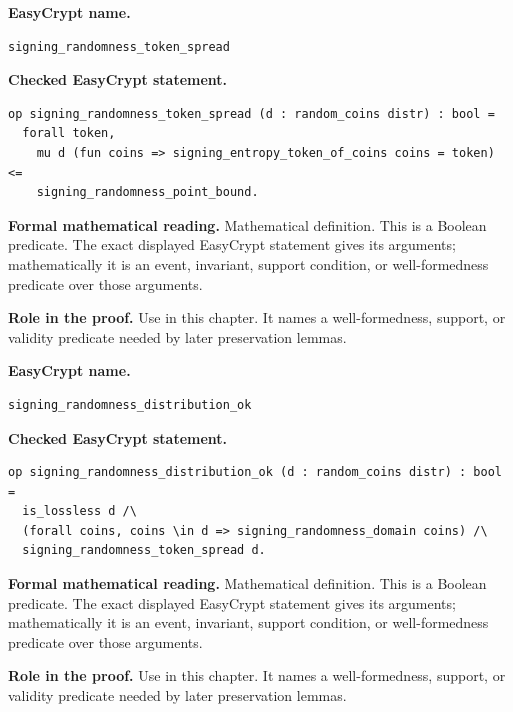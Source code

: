 \begin{formaldefinition}
\noindent\textbf{EasyCrypt name.}
\begin{lstlisting}[language=EasyCrypt,basicstyle=\ttfamily\scriptsize]
signing_randomness_token_spread
\end{lstlisting}
\noindent\textbf{Checked EasyCrypt statement.}
\begin{lstlisting}[language=EasyCrypt,basicstyle=\ttfamily\scriptsize]
op signing_randomness_token_spread (d : random_coins distr) : bool =
  forall token,
    mu d (fun coins => signing_entropy_token_of_coins coins = token) <=
    signing_randomness_point_bound.
\end{lstlisting}
\noindent\textbf{Formal mathematical reading.}
Mathematical definition. This is a Boolean predicate.  The exact displayed EasyCrypt statement gives its arguments; mathematically it is an event, invariant, support condition, or well-formedness predicate over those arguments.

\noindent\textbf{Role in the proof.}
Use in this chapter. It names a well-formedness, support, or validity predicate needed by later preservation lemmas.

\end{formaldefinition}

\begin{formaldefinition}
\noindent\textbf{EasyCrypt name.}
\begin{lstlisting}[language=EasyCrypt,basicstyle=\ttfamily\scriptsize]
signing_randomness_distribution_ok
\end{lstlisting}
\noindent\textbf{Checked EasyCrypt statement.}
\begin{lstlisting}[language=EasyCrypt,basicstyle=\ttfamily\scriptsize]
op signing_randomness_distribution_ok (d : random_coins distr) : bool =
  is_lossless d /\
  (forall coins, coins \in d => signing_randomness_domain coins) /\
  signing_randomness_token_spread d.
\end{lstlisting}
\noindent\textbf{Formal mathematical reading.}
Mathematical definition. This is a Boolean predicate.  The exact displayed EasyCrypt statement gives its arguments; mathematically it is an event, invariant, support condition, or well-formedness predicate over those arguments.

\noindent\textbf{Role in the proof.}
Use in this chapter. It names a well-formedness, support, or validity predicate needed by later preservation lemmas.

\end{formaldefinition}

